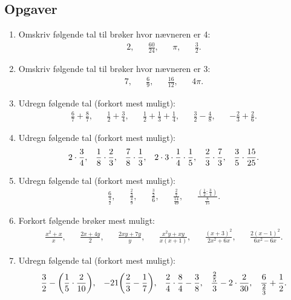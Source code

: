 \subsection{Opgaver}

\begin{enumerate}
\item Omskriv følgende tal til brøker hvor nævneren er 4:
\begin{align*}
2,&& \iffalse 5,&&  \frac{4}{8},&& \fi \frac{60}{24},&& \pi,&& \frac{3}{2}.%
\end{align*}
\item Omskriv følgende tal til brøker hvor nævneren er 3:
\begin{align*}
7,&& \iffalse 3,&&\frac{2}{6},&& \fi \frac{6}{9},&&\frac{16}{12},&&4\pi.%
\end{align*}
\item Udregn følgende tal (forkort mest muligt):
\begin{align*}
\frac{6}{7}+\frac{8}{7},&& \frac{1}{2}+\frac{3}{4},&& \frac{1}{2}+\frac{1}{3}+\frac{1}{4},&& \frac{3}{2}-\frac{4}{8},&&-\frac{2}{3}+\frac{2}{6}.
\end{align*}
\item Udregn følgende tal (forkort mest muligt):
\begin{align*}
2\cdot\frac{3}{4},&&\frac{1}{8}\cdot \frac{2}{3},&& \frac{7}{8}\cdot \frac{1}{3},&& 2\cdot3\cdot \frac{1}{4}\cdot\frac{1}{5},&&\frac{2}{3}\cdot \frac{7}{3},&&\frac{3}{5}\cdot \frac{15}{25}.
\end{align*}
\item Udregn følgende tal (forkort mest muligt):
\begin{align*}
\frac{6}{ \frac{3}{2}},&& \frac{ \frac{2}{3}}{ \frac{4}{9}},&& \frac{ \frac{3}{2}}{6},&& \frac{ \frac{2}{7}}{ \frac{14}{49}},&& \frac{ (\frac{1}{2}:\frac{3}{4})}{ \frac{8}{15}}.
\end{align*}
\item Forkort følgende brøker mest muligt:
\begin{align*}
\frac{x^2+x}{x},&& \frac{2x+4y}{2},&& \frac{2xy+7y}{y},&&\frac{x^2y+xy}{x(x+1)},&& \frac{(x+3)^2}{2x^2+6x},&& \frac{2 (x-1)^2}{6x^2-6x}.
\end{align*}
\item Udregn følgende tal (forkort mest muligt):
\begin{align*}
\frac{3}{2}-\bigg(\frac{1}{5}\c \frac{2}{10}\bigg),&& -21\bigg( \frac{2}{3}- \frac{1}{7}\bigg),&& \frac{2}{4}\c \frac{8}{4}-\frac{3}{8},&& \frac{\frac{2}{5}}{3}-2\c \frac{2}{30},&& \frac{6}{ \frac{2}{3}} +\frac{1}{2}.

\end{align*}
\end{enumerate}

